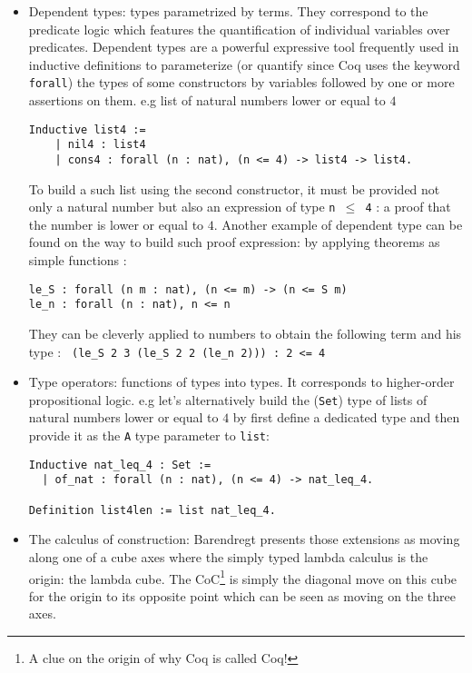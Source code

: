 \documentclass{article}
\begin{document}
\begin{itemize}
\begin{itemize}
                    \item Dependent types: types parametrized by terms. They correspond to the predicate logic which features the quantification of individual variables over predicates. Dependent types are a powerful expressive tool frequently used in inductive definitions to parameterize (or quantify since Coq uses the keyword \texttt{forall}) the types of some constructors by variables followed by one or more assertions on them. e.g list of natural numbers lower or equal to $4$
                     \begin{verbatim}Inductive list4 :=
    | nil4 : list4 
    | cons4 : forall (n : nat), (n <= 4) -> list4 -> list4.\end{verbatim}
                    To build a such list using the second constructor, it must be provided not only a natural number but also an expression of type \texttt{n $\leq$ 4} : a proof that the number is lower or equal to $4$. Another example of dependent type can be found on the way to build such proof expression: by applying theorems as simple functions :
                    \begin{verbatim}
le_S : forall (n m : nat), (n <= m) -> (n <= S m)
le_n : forall (n : nat), n <= n
                    \end{verbatim}
                    They can be cleverly applied to numbers to obtain the following term and his type : \verb| (le_S 2 3 (le_S 2 2 (le_n 2))) : 2 <= 4|

                    \item Type operators: functions of types into types. It corresponds to higher-order propositional logic. e.g let's alternatively build the (\texttt{Set}) type of lists of natural numbers lower or equal to $4$ by first define a dedicated type and then provide it as the \texttt{A} type parameter to \texttt{list}:
                    \begin{verbatim}Inductive nat_leq_4 : Set :=
  | of_nat : forall (n : nat), (n <= 4) -> nat_leq_4.

Definition list4len := list nat_leq_4.\end{verbatim}

                    \item The calculus of construction: Barendregt presents those extensions as moving along one of a cube axes where the simply typed lambda calculus is the origin: the lambda cube. The CoC\footnote{A clue on the origin of why Coq is called Coq!} is simply the diagonal move on this cube for the origin to its opposite point which can be seen as moving on the three axes.
                    
                \end{itemize}
        \end{itemize}
\end{document}
